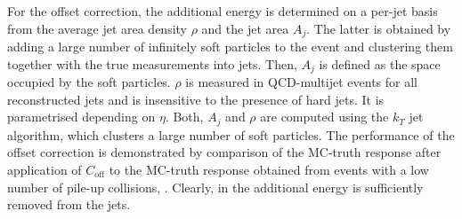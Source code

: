 For the offset correction, the additional energy is determined on a per-jet basis from the average jet \pt area density $\rho$ and the jet area $A_{j}$.
The latter is obtained by adding a large number of infinitely soft particles to the event and clustering them together with the true measurements into jets.
Then, $A_{j}$ is defined as the space occupied by the soft particles.
$\rho$ is measured in QCD-multijet events for all reconstructed jets and is insensitive to the presence of hard jets.
It is parametrised depending on $\eta$.
Both, $A_{j}$ and $\rho$ are computed using the $k_{T}$ jet algorithm, which clusters a large number of soft particles.
The performance of the offset correction is demonstrated by comparison of the MC-truth response after application of $C_{\text{off}}$ to the MC-truth response obtained from events with a low number of pile-up collisions, \cf {}.
Clearly, in the additional energy is sufficiently removed from the jets.

